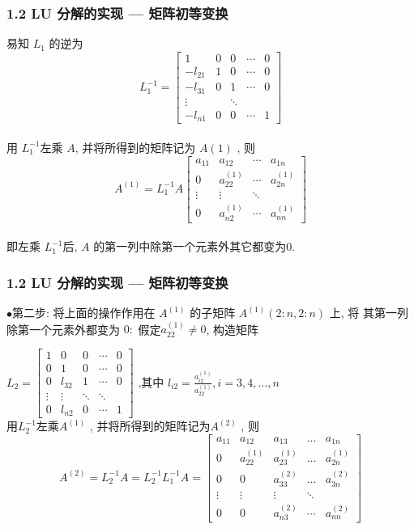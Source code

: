 \documentclass[notheorems,serif]{beamer}
\begin{document}
\begin{frame}
\frametitle{1.2 \quad LU 分解的实现 — 矩阵初等变换}
易知 $L_1$ 的逆为
$$
L_{1}^{-1}=\left[\begin{array}{ccccc}{1} & {0} & {0} & {\cdots} & {0} \\ {-l_{21}} & {1} & {0} & {\cdots} & {0} \\ {-l_{31}} & {0} & {1} & {\cdots} & {0} \\ {\vdots} & {} & {\ddots} & {} \\ {-l_{n 1}} & {0} & {0} & {\cdots} & {1}\end{array}\right]
$$
\\
用 $L^{−1}_1 $左乘 $A$, 并将所得到的矩阵记为 $A(1)$
, 则
$$
A^{(1)}=L_{1}^{-1} A\left[\begin{array}{cccc}{a_{11}} & {a_{12}} & {\cdots} & {a_{1 n}} \\ {0} & {a_{22}^{(1)}} & {\cdots} & {a_{2 n}^{(1)}} \\ {\vdots} & {\vdots} & {\ddots} & {} \\ {0} & {a_{n 2}^{(1)}} & {\cdots} & {a_{n n}^{(1)}}\end{array}\right]
$$
\\
即左乘 $L^{−1}_1 $后, $A$ 的第一列中除第一个元素外其它都变为$ 0$.
\end{frame}

\begin{frame}
\frametitle{1.2 \quad LU 分解的实现 — 矩阵初等变换}
$\bullet$第二步: 将上面的操作作用在 $A^{(1)}$ 的子矩阵 $A^{(1)}(2 : n, 2 : n)$ 上, 将
其第一列除第一个元素外都变为 $0:$ 假定$ a^{(1)}_{22} \neq 0$, 构造矩阵

{$L_{2}=\left[\begin{array}{ccccc}{1} & {0} & {0} & {\cdots} & {0} \\ {0} & {1} & {0} & {\cdots} & {0} \\ {0} & {l_{32}} & {1} & {\cdots} & {0} \\ {\vdots} & {\vdots} & {\ddots} & {\ddots} \\ {0} & {l_{n 2}} & {0} & {\cdots} & {1}\end{array}\right]$ $\text{,其中}$ $l_{i 2}=\frac{a_{i 2}^{(1)}}{a_{22}^{(1)}}, i=3,4, \ldots, n$}\\

用$L_{2}^{-1}$左乘$A^{(1)}$
, 并将所得到的矩阵记为$A^{(2)}$
, 则
$$
A^{(2)}=L_{2}^{-1} A=L_{2}^{-1} L_{1}^{-1}A=\left[\begin{array}{ccccc}{a_{11}} & {a_{12}} & {a_{13}} & {\dots} &{a_{1 n}} \\ {0} & {a_{22}^{(1)}} & {a_{23}^{(1)}} & {\dots} & {a_{2 n}^{(1)}} \\ {0} & {0} & {a_{33}^{(2)}} & {\dots} & {a_{3 n}^{(2)}} \\ {\vdots} & {\vdots} & {\vdots} & {\ddots} &{ } \\ {0} & {0} & {a_{n 3}^{(2)}} & {\cdots} & {a_{n n}^{(2)}}\end{array}\right]
$$
\end{frame}
\end{document}
